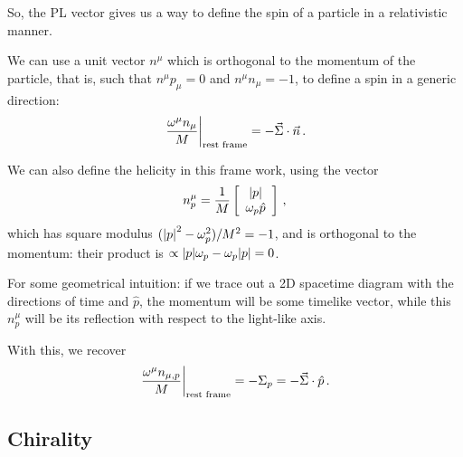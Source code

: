 \documentclass[main.tex]{subfiles}
\begin{document}

So, the PL vector gives us a way to define the spin of a particle in a relativistic manner. 

We can use a unit vector \(n^{\mu }\) which is orthogonal to the momentum of the particle, that is, such that \(n^{\mu } p_{\mu }=0\) and \(n^{\mu } n_{\mu }=-1\), to define a spin in a generic direction: 
%
\begin{align}
\eval{\frac{\omega^{\mu }n_{\mu }}{M}}_{\text{rest frame}} = - \vec{\Sigma} \cdot \vec{n}
\,.
\end{align}

We can also define the helicity in this frame work, using the vector 
%
\begin{align}
n^{\mu }_{p} = \frac{1}{M} \left[\begin{array}{c}
\abs{p} \\ 
\omega_{p} \hat{p}
\end{array}\right]
\,,
\end{align}
%
which has square modulus \((\abs{p}^2 - \omega_{p}^2) / M^2 = -1\), and is orthogonal to the momentum: their product is \(\propto \abs{p} \omega_{p}  - \omega_{p} \abs{p} = 0\).

For some geometrical intuition: if we trace out a 2D spacetime diagram with the directions of time and \(\hat{p}\), the momentum will be some timelike vector, while this \(n^{\mu }_{p}\) will be its reflection with respect to the light-like axis.

With this, we recover 
%
\begin{align}
\eval{\frac{\omega^{\mu }n_{\mu , p}}{M}}_{\text{rest frame}}
= - \Sigma_{p} = - \vec{\Sigma} \cdot \hat{p}
\,.
\end{align}
%
\subsection{Chirality}
\end{document}
